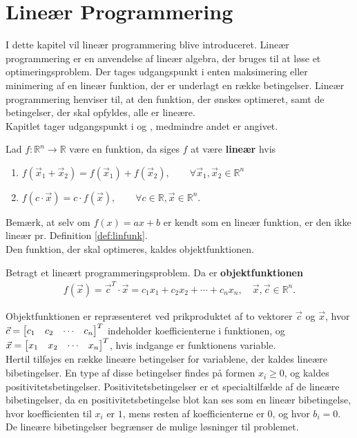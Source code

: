 \chapter{Lineær Programmering}
I dette kapitel vil lineær programmering blive introduceret.
Lineær programmering er en anvendelse af lineær algebra, der bruges til at løse et optimeringsproblem. Der tages udgangspunkt i enten maksimering eller minimering af en lineær funktion, der er underlagt en række betingelser. 
Lineær programmering henviser til, at den funktion, der ønskes optimeret, samt de betingelser, der skal opfyldes, alle er lineære. \\
Kapitlet tager udgangspunkt i \citep{bert} og \citep{lay}, medmindre andet er angivet. 

\begin{defn}
Lad $f:\mathds{R}^n \to \mathds{R}$ være en funktion, da siges $f$ at være \textbf{lineær} hvis
\begin{enumerate}[label=\alph*]
\item $f(\vec{x}_1 + \vec{x}_2) = f(\vec{x}_1) + f(\vec{x}_2), \qquad \forall \vec{x}_1,\vec{x}_2\in \mathds{R}^n$
\item $f(c\cdot \vec{x}) = c \cdot f(\vec{x}), \qquad \forall c \in \mathds{R}, \vec{x} \in \mathds{R}^n$.
\end{enumerate}
\label{def:linfunk}
\end{defn}

Bemærk, at selv om $f(x) = ax + b$ er kendt som en lineær funktion, er den ikke lineær pr. Definition \ref{def:linfunk}.\\
Den funktion, der skal optimeres, kaldes objektfunktionen.
\begin{defn}
Betragt et lineært programmeringsproblem. Da er \textbf{objektfunktionen}
\begin{align*}
f(\vec{x}) = \vec{c}^T \cdot \vec{x} = c_1x_1 + c_2x_2 + \cdots + c_nx_n, \quad  \vec{x}, \vec{c} \in \mathds{R}^n. 
\end{align*}
\end{defn}

Objektfunktionen er repræsenteret ved prikproduktet af to vektorer $\vec{c}$ og $\vec{x}$, hvor \\
$\vec{c}= \begin{bmatrix} c_1 & c_2 & \cdots & c_n \end{bmatrix}^T$ indeholder koefficienterne i funktionen, og $\vec{x}= \begin{bmatrix} x_1 & x_2 & \cdots & x_n \end{bmatrix}^T$, hvis indgange er funktionens variable. \\
Hertil tilføjes en række lineære betingelser for variablene, der kaldes lineære bibetingelser. 
En type af disse betingelser findes på formen $x_i \geq 0$, og kaldes positivitetsbetingelser. Positivitetsbetingelser er et specialtilfælde af de lineære bibetingelser, da en positivitetsbetingelse blot kan ses som en lineær bibetingelse, hvor koefficienten til $x_i$ er $1$, mens resten af koefficienterne er $0$, og hvor $b_i=0$. \\
De lineære bibetingelser begrænser de mulige løsninger til problemet.


